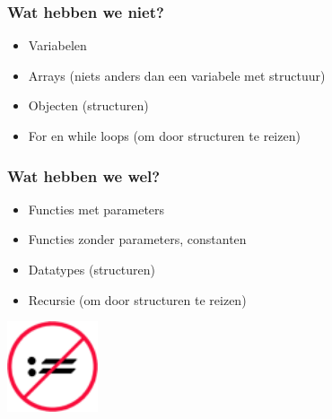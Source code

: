 \documentclass{beamer}
\begin{document}
\begin{frame}
    \frametitle{Wat hebben we niet?}
    \begin{itemize}
        \item Variabelen
        \item Arrays (niets anders dan een variabele met structuur)
        \item Objecten (structuren)
        \item For en while loops (om door structuren te reizen)
    \end{itemize}
\end{frame}

\begin{frame}
    \frametitle{Wat hebben we wel?}
    \begin{itemize}
        \item Functies met parameters
        \item Functies zonder parameters, constanten
        \item Datatypes (structuren)
        \item Recursie (om door structuren te reizen)
    \end{itemize}
    \includegraphics[width=0.2\textwidth]{no_assignment.png}
\end{frame}
\end{document}
